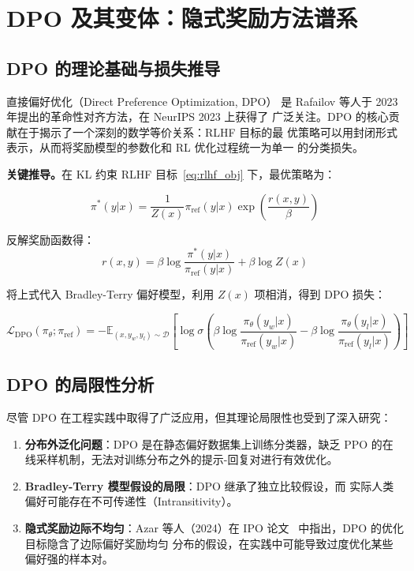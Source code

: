 \documentclass[12pt,a4paper,UTF8]{ctexart}
\newcommand{\E}{\mathbb{E}}
\newcommand{\sigmoid}{\sigma}
\newcommand{\piref}{\pi_{\mathrm{ref}}}
\newcommand{\pitheta}{\pi_{\theta}}
\newcommand{\pistar}{\pi^{*}}
\begin{document}
\section{DPO 及其变体：隐式奖励方法谱系}
\label{sec:dpo}

\subsection{DPO 的理论基础与损失推导}

直接偏好优化（Direct Preference Optimization, DPO）\cite{rafailov2023dpo}
是 Rafailov 等人于 2023 年提出的革命性对齐方法，在 NeurIPS 2023 上获得了
广泛关注。DPO 的核心贡献在于揭示了一个深刻的数学等价关系：RLHF 目标的最
优策略可以用封闭形式表示，从而将奖励模型的参数化和 RL 优化过程统一为单一
的分类损失。

\textbf{关键推导。}在 KL 约束 RLHF 目标~\eqref{eq:rlhf_obj} 下，最优策略为：

\begin{equation}
  \pistar(y|x)
    = \frac{1}{Z(x)}\piref(y|x)\exp\!\left(\frac{r(x,y)}{\beta}\right)
  \label{eq:optimal_policy}
\end{equation}

反解奖励函数得：
\begin{equation}
  r(x,y) = \beta\log\frac{\pistar(y|x)}{\piref(y|x)} + \beta\log Z(x)
\end{equation}

将上式代入 Bradley-Terry 偏好模型，利用 $Z(x)$ 项相消，得到 DPO 损失：

\begin{equation}
  \mathcal{L}_{\mathrm{DPO}}(\pitheta;\piref)
    = -\E_{(x,y_w,y_l)\sim\mathcal{D}}\!\left[
        \log\sigmoid\!\left(
          \beta\log\frac{\pitheta(y_w|x)}{\piref(y_w|x)}
          - \beta\log\frac{\pitheta(y_l|x)}{\piref(y_l|x)}
        \right)
      \right]
  \label{eq:dpo_loss}
\end{equation}

\subsection{DPO 的局限性分析}

尽管 DPO 在工程实践中取得了广泛应用，但其理论局限性也受到了深入研究：
\begin{enumerate}[leftmargin=2em]
  \item \textbf{分布外泛化问题}：DPO 是在静态偏好数据集上训练分类器，缺乏
    PPO 的在线采样机制，无法对训练分布之外的提示-回复对进行有效优化。
  \item \textbf{Bradley-Terry 模型假设的局限}：DPO 继承了独立比较假设，而
    实际人类偏好可能存在不可传递性（Intransitivity）。
  \item \textbf{隐式奖励边际不均匀}：Azar 等人（2024）在 IPO
    论文~\cite{azar2024ipo} 中指出，DPO 的优化目标隐含了边际偏好奖励均匀
    分布的假设，在实践中可能导致过度优化某些偏好强的样本对。
\end{enumerate}
\end{document}
